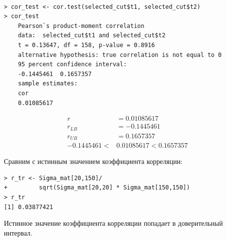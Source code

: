 \documentclass[14pt,a4paper]{scrartcl}
\begin{document}
\begin{figure}[H]
	\begin{minipage}[h]{1\linewidth}
		  \\
	\end{minipage}
\end{figure}

\begin{verbatim}
> cor_test <- cor.test(selected_cut$t1, selected_cut$t2)
> cor_test
	Pearson`s product-moment correlation
	data:  selected_cut$t1 and selected_cut$t2
	t = 0.13647, df = 158, p-value = 0.8916
	alternative hypothesis: true correlation is not equal to 0
	95 percent confidence interval:
	-0.1445461  0.1657357
	sample estimates:
	cor 
	0.01085617 
\end{verbatim}
\begin{align*}
	r &= 0.01085617 \\
	r_{LB} &= -0.1445461\\
	r_{UB} &= 0.1657357\\
	-0.1445461 < &0.01085617 < 0.1657357
\end{align*}

\begin{tcolorbox}[colback=red!5!white,colframe=red!75!black]
	Сравним с истинным значением коэффициента корреляции:
\begin{verbatim}
> r_tr <- Sigma_mat[20,150]/
+         sqrt(Sigma_mat[20,20] * Sigma_mat[150,150])
> r_tr
[1] 0.03877421
\end{verbatim}
	
	Истинное значение коэффициента корреляции попадает в доверительный интервал.
\end{tcolorbox}




\pagebreak
\end{document}
